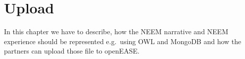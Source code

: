 \chapter{Upload}
In this chapter we have to describe, how the NEEM narrative and NEEM experience should be represented e.g.\ using OWL and MongoDB and how the partners can upload those file to openEASE.